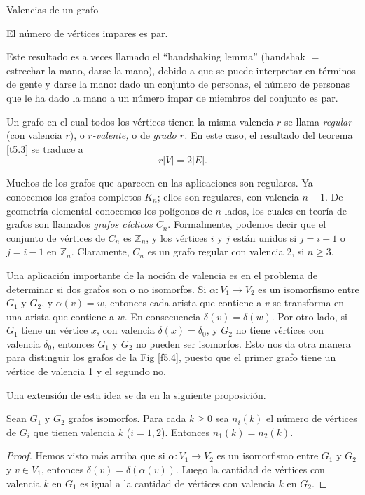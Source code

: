 \begin{section}{Valencias de un grafo}
\begin{teorema} El número de vértices impares es par.
\end{teorema}

Este resultado es a veces llamado el ``handshaking lemma'' (handshak $=$ estrechar la mano, darse la   mano), debido a que se puede interpretar en términos de gente y darse la mano: dado un conjunto de personas, el número de personas que le ha dado la mano a un número impar de miembros del conjunto
es par. 

Un grafo en el cual todos los vértices tienen la misma valencia $r$ se llama \textit{regular}   (con valencia $r$), o \textit{$r$-valente,} o de \textit{grado $r$.} En este caso, el resultado del teorema \ref{t5.3} se traduce a
$$
r|V|=2|E|.
$$

Muchos de los grafos que aparecen en las aplicaciones son regulares. Ya conocemos los  grafos completos $K_n$; ellos son regulares, con valencia $n-1$. De geometría elemental conocemos los polígonos de $n$ lados, los cuales en teoría de grafos son llamados \textit{{grafos cíclicos}}   $C_n$. Formalmente, podemos decir que el conjunto de vértices de $C_n$ es $\mathbb Z_n$, y los vértices $i$ y $j$ están unidos si $j=i+1$ o $j=i-1$ en $\mathbb Z_n$. Claramente, $C_n$ es un grafo regular con valencia $2$, si $n\ge 3$.

Una aplicación importante de la noción de valencia es en el problema de determinar si dos grafos son o no isomorfos. Si $\alpha:V_1 \to  V_2$ es un isomorfismo entre $G_1$ y $G_2$, y $\alpha(v)=w$, entonces cada arista que contiene a $v$ se transforma en una arista que contiene a $w$. En consecuencia $\delta(v)=\delta(w)$. Por otro lado, si $G_1$ tiene un vértice $x$, con valencia $\delta(x)=\delta_0$, y $G_2$ no tiene vértices con valencia $\delta_0$, entonces $G_1$ y $G_2$ no pueden ser isomorfos. Esto nos da otra manera para distinguir los grafos de la Fig \ref{f5.4}, puesto que el primer grafo tiene un vértice de valencia 1 y el segundo no.

Una extensión de esta idea se da en la siguiente proposición.

\begin{proposicion}\label{criterioiso}Sean  $G_1$ y $G_2$ grafos isomorfos. Para cada $k\ge 0$ sea $n_i(k)$ el número de vértices de $G_i$ que tienen valencia $k$ ($i=1,2$). Entonces $n_1(k)=n_2(k)$.
\end{proposicion}
\begin{proof} Hemos visto más arriba que si $\alpha:V_1 \to  V_2$ es un isomorfismo entre $G_1$ y $G_2$ y $v\in V_1$, entonces $\delta(v)=\delta(\alpha(v))$. Luego la cantidad de vértices con valencia $k$ en $G_1$ es igual  a la cantidad de vértices con valencia $k$ en $G_2$.     
\end{proof}


\end{section}
